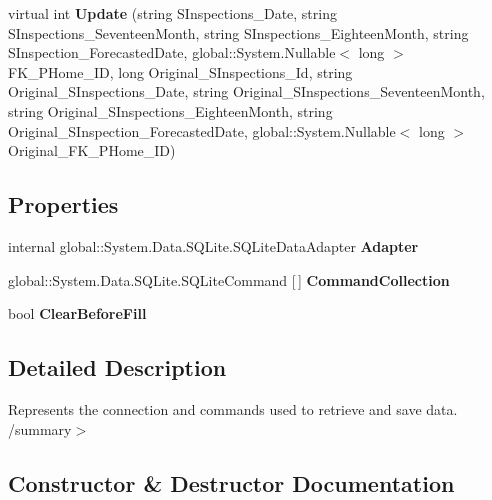 \begin{DoxyCompactItemize}
\item 
virtual int \textbf{ Update} (string S\+Inspections\+\_\+\+Date, string S\+Inspections\+\_\+\+Seventeen\+Month, string S\+Inspections\+\_\+\+Eighteen\+Month, string S\+Inspection\+\_\+\+Forecasted\+Date, global\+::\+System.\+Nullable$<$ long $>$ F\+K\+\_\+\+P\+Home\+\_\+\+ID, long Original\+\_\+\+S\+Inspections\+\_\+\+Id, string Original\+\_\+\+S\+Inspections\+\_\+\+Date, string Original\+\_\+\+S\+Inspections\+\_\+\+Seventeen\+Month, string Original\+\_\+\+S\+Inspections\+\_\+\+Eighteen\+Month, string Original\+\_\+\+S\+Inspection\+\_\+\+Forecasted\+Date, global\+::\+System.\+Nullable$<$ long $>$ Original\+\_\+\+F\+K\+\_\+\+P\+Home\+\_\+\+ID)
\end{DoxyCompactItemize}
\subsection*{Properties}
\begin{DoxyCompactItemize}
\item 
internal global\+::\+System.\+Data.\+S\+Q\+Lite.\+S\+Q\+Lite\+Data\+Adapter \textbf{ Adapter}\hspace{0.3cm}{\ttfamily  [get]}
\item 
global\+::\+System.\+Data.\+S\+Q\+Lite.\+S\+Q\+Lite\+Command [$\,$] \textbf{ Command\+Collection}\hspace{0.3cm}{\ttfamily  [get]}
\item 
bool \textbf{ Clear\+Before\+Fill}\hspace{0.3cm}{\ttfamily  [get, set]}
\end{DoxyCompactItemize}


\subsection{Detailed Description}
Represents the connection and commands used to retrieve and save data. /summary$>$ 

\subsection{Constructor \& Destructor Documentation}
\mbox{\label{class_a_f_h___scheduler_1_1_home_inspection_data_set_table_adapters_1_1_scheduled___inspections_table_adapter_af4c72bb784f99ea80841ef5644c87a15}} 
